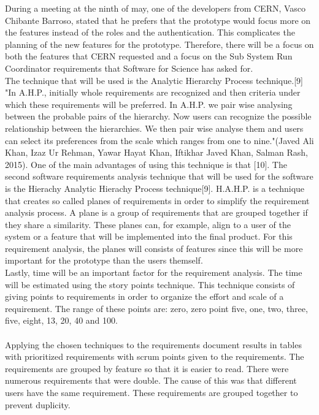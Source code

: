 \documentclass[paper=a4, fontsize=11pt,twoside]{scrartcl}	%
\begin{document}
During a meeting at the ninth of may, one of the developers from CERN, Vasco Chibante Barroso, stated that he prefers that the prototype would focus more on the features instead of the roles and the authentication. This complicates the planning of the new features for the prototype. Therefore, there will be a focus on both the features that CERN requested and a focus on the Sub System Run Coordinator requirements that Software for Science has asked for. \\ 
The technique that will be used is the Analytic Hierarchy Process technique.[9] "In A.H.P., initially whole requirements are recognized and then criteria under which these requirements will be preferred. In A.H.P. we pair wise analysing  between  the  probable  pairs  of  the  hierarchy. 
Now users can recognize the possible relationship between 
the hierarchies. We then pair wise analyse them and users can select its preferences from the scale which ranges from 
one to nine."(Javed Ali Khan, Izaz Ur Rehman, Yawar Hayat Khan, Iftikhar Javed Khan, Salman Rash, 2015). One of the main advantages of using this technique is that [10]. The second software requirements analysis technique that will be used for the software is the Hierachy Analytic Hierachy Process technique[9]. H.A.H.P. is a technique that creates so called planes of requirements in order to simplify the requirement analysis process. A plane is a group of requirements that are grouped together if they share a similarity. These planes can, for example, align to a user of the system or a feature that will be implemented into the final product. For this requirement analysis, the planes will consists of features since this will be more important for the prototype than the users themself. \\
Lastly, time will be an important factor for the requirement analysis. The time will be estimated using the story points technique. This technique consists of giving  points to requirements in order to organize the effort and scale of a requirement. The range of these points are:  zero, zero point five, one, two, three, five, eight, 13, 20, 40 and 100. \\ \\
Applying the chosen techniques to the requirements document results in tables with prioritized requirements with scrum points given to the requirements. The requirements are grouped by feature so that it is easier to read. There were numerous requirements that were double. The cause of this was that different users have the same requirement. These requirements are grouped together to prevent duplicity. \\
\end{document}
